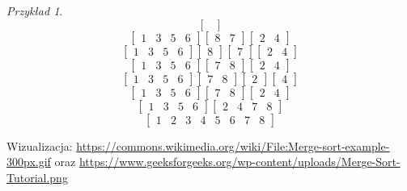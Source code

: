 \documentclass[10pt, oneside]{article}
\theoremstyle{remark}
\newtheorem*{example}{Przykład}
\begin{document}
\begin{example}
$$\begin{bmatrix}
\end{bmatrix}$$
$$\begin{bmatrix}
	1 & 3 & 5 & 6 \end{bmatrix} \begin{bmatrix} 8 & 7 \end{bmatrix} \begin{bmatrix} 2 & 4
\end{bmatrix}$$
$$\begin{bmatrix}
	1 & 3 & 5 & 6 \end{bmatrix} \begin{bmatrix} 8 \end{bmatrix} \begin{bmatrix} 7 \end{bmatrix} \begin{bmatrix} 2 & 4
\end{bmatrix}$$
$$\begin{bmatrix}
	1 & 3 & 5 & 6 \end{bmatrix} \begin{bmatrix} 7 & 8 \end{bmatrix} \begin{bmatrix} 2 & 4
\end{bmatrix}$$
$$\begin{bmatrix}
	1 & 3 & 5 & 6 \end{bmatrix} \begin{bmatrix} 7 & 8 \end{bmatrix} \begin{bmatrix} 2 \end{bmatrix} \begin{bmatrix} 4
\end{bmatrix}$$
$$\begin{bmatrix}
	1 & 3 & 5 & 6 \end{bmatrix} \begin{bmatrix} 7 & 8 \end{bmatrix} \begin{bmatrix} 2 & 4
\end{bmatrix}$$
$$\begin{bmatrix}
	1 & 3 & 5 & 6 \end{bmatrix} \begin{bmatrix} 2 & 4 & 7 & 8
\end{bmatrix}$$
$$\begin{bmatrix}
	1 & 2 & 3 & 4 & 5 & 6 & 7 & 8
\end{bmatrix}$$

Wizualizacja: \url{https://commons.wikimedia.org/wiki/File:Merge-sort-example-300px.gif} oraz \url{https://www.geeksforgeeks.org/wp-content/uploads/Merge-Sort-Tutorial.png}
\end{example}
\end{document}
